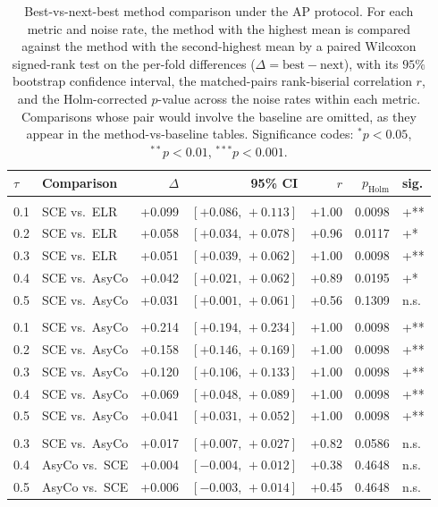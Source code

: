 \begin{table}[htbp]
\centering
\caption{Best-vs-next-best method comparison under the AP protocol. For each metric and noise rate, the method with the highest mean is compared against the method with the second-highest mean by a paired Wilcoxon signed-rank test on the per-fold differences ($\Delta = \text{best} - \text{next}$), with its $95\%$ bootstrap confidence interval, the matched-pairs rank-biserial correlation $r$, and the Holm-corrected $p$-value across the noise rates within each metric. Comparisons whose pair would involve the baseline are omitted, as they appear in the method-vs-baseline tables. Significance codes: $^{*}p<0.05$, $^{**}p<0.01$, $^{***}p<0.001$.}
\label{tab:method-between}
\begin{tabular}{llrrrrl}
\toprule
$\tau$ & Comparison & $\Delta$ & 95\% CI & $r$ & $p_{\mathrm{Holm}}$ & sig. \\
\midrule
\addlinespace
\multicolumn{7}{l}{\textit{Balanced accuracy}} \\
0.1 & SCE vs.\ ELR & +0.099 & $[+0.086,\,+0.113]$ & +1.00 & 0.0098 & +** \\
0.2 & SCE vs.\ ELR & +0.058 & $[+0.034,\,+0.078]$ & +0.96 & 0.0117 & +* \\
0.3 & SCE vs.\ ELR & +0.051 & $[+0.039,\,+0.062]$ & +1.00 & 0.0098 & +** \\
0.4 & SCE vs.\ AsyCo & +0.042 & $[+0.021,\,+0.062]$ & +0.89 & 0.0195 & +* \\
0.5 & SCE vs.\ AsyCo & +0.031 & $[+0.001,\,+0.061]$ & +0.56 & 0.1309 & n.s. \\
\addlinespace
\multicolumn{7}{l}{\textit{Macro F1}} \\
0.1 & SCE vs.\ AsyCo & +0.214 & $[+0.194,\,+0.234]$ & +1.00 & 0.0098 & +** \\
0.2 & SCE vs.\ AsyCo & +0.158 & $[+0.146,\,+0.169]$ & +1.00 & 0.0098 & +** \\
0.3 & SCE vs.\ AsyCo & +0.120 & $[+0.106,\,+0.133]$ & +1.00 & 0.0098 & +** \\
0.4 & SCE vs.\ AsyCo & +0.069 & $[+0.048,\,+0.089]$ & +1.00 & 0.0098 & +** \\
0.5 & SCE vs.\ AsyCo & +0.041 & $[+0.031,\,+0.052]$ & +1.00 & 0.0098 & +** \\
\addlinespace
\multicolumn{7}{l}{\textit{Macro AUC}} \\
0.3 & SCE vs.\ AsyCo & +0.017 & $[+0.007,\,+0.027]$ & +0.82 & 0.0586 & n.s. \\
0.4 & AsyCo vs.\ SCE & +0.004 & $[-0.004,\,+0.012]$ & +0.38 & 0.4648 & n.s. \\
0.5 & AsyCo vs.\ SCE & +0.006 & $[-0.003,\,+0.014]$ & +0.45 & 0.4648 & n.s. \\
\bottomrule
\end{tabular}
\end{table}
